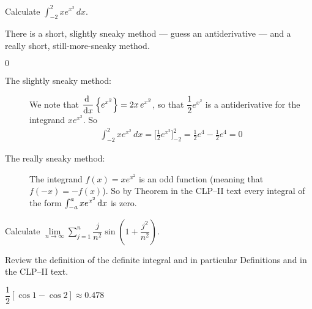 \begin{question}[2016A]
Calculate $\displaystyle\int_{-2}^2 xe^{x^2}\,dx$.
\end{question}

\begin{hint}
There is a short, slightly sneaky method --- guess an antiderivative ---
and a really short, still-more-sneaky method.
\end{hint}

\begin{answer}
$0$
\end{answer}

\begin{solution}
\begin{description}
\item[The slightly sneaky method:]
We note that $\displaystyle\diff{}{x} \left\{e^{x^2} \right\}= 2x\, e^{x^2}$, so that $\dfrac{1}{2} e^{x^2}$
is a antiderivative for the integrand $x e^{x^2}$. So
\begin{align*}
\int_{-2}^2 xe^{x^2}\,dx = \bigg[\frac{1}{2}e^{x^2}\bigg]_{-2}^2
=\frac{1}{2}e^4-\frac{1}{2}e^4=0
\end{align*}


\item[The really sneaky method:]
The integrand $f(x) = x e^{x^2}$ is an odd function (meaning that $f(-x)=-f(x)$).
So by Theorem  in the  CLP--II text every integral
of the form $\int_{-a}^a x e^{x^2}\,\mathrm{d}x$ is zero.
\end{description}
\end{solution}



\begin{question}[2000D]
Calculate $\displaystyle\lim\limits_{n\rightarrow\infty}\sum\limits_{j=1}^n
\dfrac{j}{n^2}\sin\left(1+\dfrac{j^2}{n^2}\right)$.
\end{question}

\begin{hint}
Review the definition of the definite integral and in particular
Definitions    and
                  in the
CLP--II text.
\end{hint}

\begin{answer}
$\dfrac{1}{2}[\cos 1-\cos 2]\approx0.478$
\end{answer}

